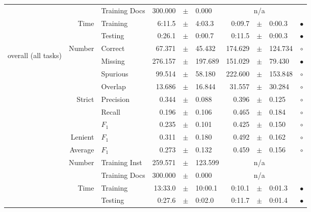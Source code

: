 \begin{longtable}{|r|r|l||rcl|rcl|c|}
\cline{3-10} &                             &   Training Docs &     300.000 &  $\pm$  &       0.000 &    \multicolumn{3}{c|}{n/a}         &  \\
\cline{2-10} & \multirow{2}{*}{      Time} &        Training &      6:11.5 &  $\pm$  &      4:03.3 &      0:09.7 &  $\pm$  &      0:00.3 & $\bullet$ \\
\cline{3-10} &                             &         Testing &      0:26.1 &  $\pm$  &      0:00.7 &      0:11.5 &  $\pm$  &      0:00.3 & $\bullet$ \\
\hline
\hline
\multirow{11}{*}{\begin{sideways}overall (all tasks)\end{sideways} }
             & \multirow{4}{*}{    Number} &         Correct &      67.371 &  $\pm$  &      45.432 &     174.629 &  $\pm$  &     124.734 & $\circ$ \\
\cline{3-10} &                             &         Missing &     276.157 &  $\pm$  &     197.689 &     151.029 &  $\pm$  &      79.430 & $\bullet$ \\
\cline{3-10} &                             &        Spurious &      99.514 &  $\pm$  &      58.180 &     222.600 &  $\pm$  &     153.848 & $\circ$ \\
\cline{3-10} &                             &         Overlap &      13.686 &  $\pm$  &      16.844 &      31.557 &  $\pm$  &      30.284 & $\circ$ \\
\cline{2-10} & \multirow{3}{*}{    Strict} &       Precision &       0.344 &  $\pm$  &       0.088 &       0.396 &  $\pm$  &       0.125 & $\circ$ \\
\cline{3-10} &                             &          Recall &       0.196 &  $\pm$  &       0.106 &       0.465 &  $\pm$  &       0.184 & $\circ$ \\
\cline{3-10} &                             &           $F_1$ &       0.235 &  $\pm$  &       0.101 &       0.425 &  $\pm$  &       0.150 & $\circ$ \\
\cline{2-10} &                     Lenient &           $F_1$ &       0.311 &  $\pm$  &       0.180 &       0.492 &  $\pm$  &       0.162 & $\circ$ \\
\cline{2-10} &                     Average &           $F_1$ &       0.273 &  $\pm$  &       0.132 &       0.459 &  $\pm$  &       0.156 & $\circ$ \\
\cline{2-10} & \multirow{2}{*}{    Number} &   Training Inst &     259.571 &  $\pm$  &     123.599 &    \multicolumn{3}{c|}{n/a}         &  \\
\cline{3-10} &                             &   Training Docs &     300.000 &  $\pm$  &       0.000 &    \multicolumn{3}{c|}{n/a}         &  \\
\cline{2-10} & \multirow{2}{*}{      Time} &        Training &     13:33.0 &  $\pm$  &     10:00.1 &      0:10.1 &  $\pm$  &      0:01.3 & $\bullet$ \\
\cline{3-10} &                             &         Testing &      0:27.6 &  $\pm$  &      0:02.0 &      0:11.7 &  $\pm$  &      0:01.4 & $\bullet$ \\
\hline
\end{longtable}

